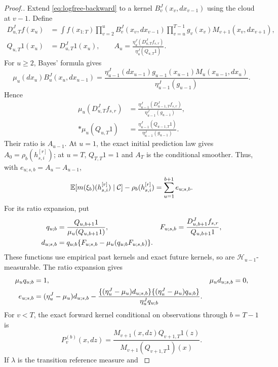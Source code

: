 \documentclass[11pt]{article}
\theoremstyle{thmstylethree}%
\begin{document}
\begin{proof}[Proof.]
{Extend \eqref{eq:logfree-backward} to a kernel $B_v^J(x_v,dx_{v-1})$
using the cloud at $v-1$. Define
\begin{align*}
D_{u,T}^Jf(x_u)
&=\int f(x_{1:T})
 \prod_{v=2}^{u}B_v^J(x_v,dx_{v-1})
 \prod_{v=u}^{T-1}g_v(x_v)M_{v+1}(x_v,dx_{v+1}),\\
Q_{u,T}1(x_u)&=D_{u,T}^J1(x_u),\qquad
A_u=\frac{\eta_u^J(D_{u,T}^Jf_{s,r})}{\eta_u^J(Q_{u,T}1)}.
\end{align*}
For $u\geq2$, Bayes' formula gives
\[
\mu_u(dx_u)B_u^J(x_u,dx_{u-1})
=\frac{\eta_{u-1}^J(dx_{u-1})g_{u-1}(x_{u-1})
                 M_u(x_{u-1},dx_u)}{\eta_{u-1}^J(g_{u-1})}.
\]
Hence
\begin{align*}
\mu_u(D_{u,T}^Jf_{s,r})
&=\frac{\eta_{u-1}^J(D_{u-1,T}^Jf_{s,r})}
             {\eta_{u-1}^J(g_{u-1})},\\*
\mu_u(Q_{u,T}1)
&=\frac{\eta_{u-1}^J(Q_{u-1,T}1)}{\eta_{u-1}^J(g_{u-1})}.
\end{align*}
Their ratio is $A_{u-1}$. At $u=1$, the exact initial prediction law
gives $A_0=\rho_b(h_{s,i}^{[r]})$; at $u=T$, $Q_{T,T}1=1$ and
$A_T$ is the conditional smoother. Thus, with $e_{u;s,b}=A_u-A_{u-1}$,
\begin{equation}
\mathbb{E}[m(\xi_b)(h_{s,i}^{[r]})\mid\mathcal C]
 -\rho_b(h_{s,i}^{[r]})=\sum_{u=1}^{b+1}e_{u;s,b}.
\label{eq:logfree-dds}
\end{equation}
For its ratio expansion, put
\begin{align}
q_{u;b}&=\frac{Q_{u,b+1}1}{\mu_u(Q_{u,b+1}1)},
&F_{u;s,b}&=\frac{D_{u,b+1}^Jf_{s,r}}{Q_{u,b+1}1},\notag\\
d_{u;s,b}&=q_{u;b}\{F_{u;s,b}-\mu_u(q_{u;b}F_{u;s,b})\}.
\end{align}
These functions use empirical past kernels and exact future kernels,
so are $\mathcal H_{u-1}$-measurable. The ratio expansion gives
\begin{align}
\mu_uq_{u;b}&=1,&\mu_ud_{u;s,b}&=0,\notag\\
e_{u;s,b}
&=(\eta_u^J-\mu_u)d_{u;s,b}
-\frac{\{(\eta_u^J-\mu_u)d_{u;s,b}\}
        \{(\eta_u^J-\mu_u)q_{u;b}\}}{\eta_u^Jq_{u;b}}.
\label{eq:logfree-ratio}
\end{align}
For $v<T$, the exact forward kernel conditional on observations
through $b=T-1$ is
\begin{equation}
P_v^{(b)}(x,dz)=
\frac{M_{v+1}(x,dz)Q_{v+1,T}1(z)}
     {M_{v+1}(Q_{v+1,T}1)(x)}.
\label{eq:weak-bias-forward-normalized-kernel}
\end{equation}
If $\lambda$ is the transition reference measure and
}
\end{proof}
\end{document}
